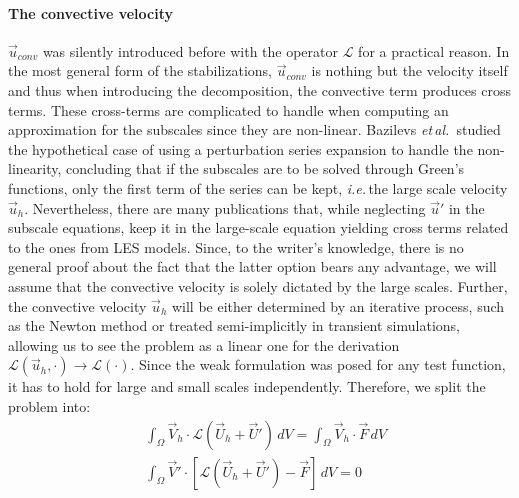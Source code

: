 \paragraph{The convective velocity} $\vec{u}_{conv}$ was silently introduced before with the operator $\mathcal{L}$ for a practical reason. In the most general form of the stabilizations, $\vec{u}_{conv}$ is nothing but the velocity itself and thus when introducing the decomposition, the convective term produces cross terms. These cross-terms are complicated to handle when computing an approximation for the subscales since they are non-linear. Bazilevs \textit{et\,al.}\,\cite{Bazilevs2007} studied the hypothetical case of using a perturbation series expansion to handle the non-linearity, concluding that if the subscales are to be solved through Green's functions, only the first term of the series can be kept, \textit{i.e.}\,the large scale velocity $\vec{u}_h$. Nevertheless, there are many publications that, while neglecting $\vec{u}'$ in the subscale equations, keep it in the large-scale equation yielding cross terms related to the ones from LES models. Since, to the writer's knowledge, there is no general proof about the fact that the latter option bears any advantage, we will assume that the convective velocity is solely dictated by the large scales. Further, the convective velocity $\vec{u}_h$ will be either determined by an iterative process, such as the Newton method or treated semi-implicitly in transient simulations, allowing us to see the problem as a linear one for the derivation $\mathcal{L}(\vec{u}_{h}, \cdot) \rightarrow \mathcal{L}(\cdot)$. Since the weak formulation was posed for any test function, it has to hold for large and small scales independently. Therefore, we split the problem into:
\begin{equation}
	\begin{split}
		&\int_{\Omega} \vec{V}_h \cdot \mathcal{L}(\vec{U}_h + \vec{U}') \,dV = \int_{\Omega} \vec{V}_h \cdot \vec{F} \,dV\\
		&\int_{\Omega} \vec{V}' \cdot [\mathcal{L}(\vec{U}_h + \vec{U}') - \vec{F}] \,dV = 0
	\end{split}\label{eqn:small_large_scales}
\end{equation}
